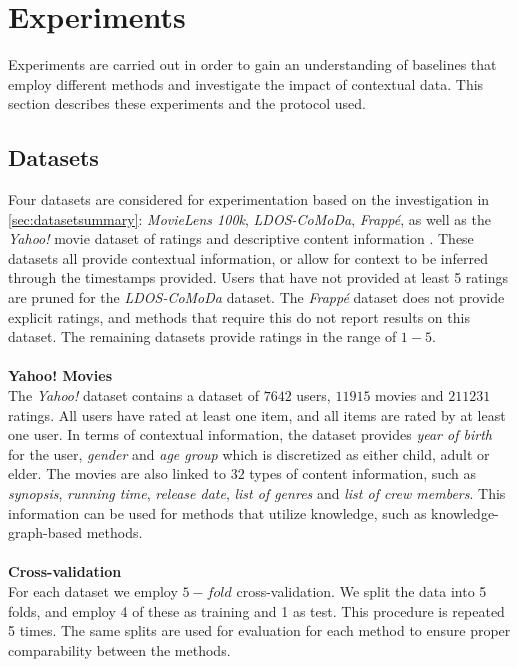 \section{Experiments}
Experiments are carried out in order to gain an understanding of baselines that employ different methods and investigate the impact of contextual data.
This section describes these experiments and the protocol used.

\subsection{Datasets}
Four datasets are considered for experimentation based on the investigation in \autoref{sec:datasetsummary}: \textit{MovieLens 100k}, \textit{LDOS-CoMoDa}, \textit{Frappé}, as well as the \textit{Yahoo!} movie dataset of ratings and descriptive content information \cite{yahoo-movie}.
These datasets all provide contextual information, or allow for context to be inferred through the timestamps provided.
Users that have not provided at least 5 ratings are pruned for the \textit{LDOS-CoMoDa} dataset.
The \textit{Frappé} dataset does not provide explicit ratings, and methods that require this do not report results on this dataset.
The remaining datasets provide ratings in the range of $1-5$.
\\\\
\textbf{Yahoo! Movies}\\
The \textit{Yahoo!} dataset contains a dataset of $7642$ users, $11915$ movies and $211231$ ratings.
All users have rated at least one item, and all items are rated by at least one user.
In terms of contextual information, the dataset provides \textit{year of birth} for the user, \textit{gender} and \textit{age group} which is discretized as either child, adult or elder.
The movies are also linked to $32$ types of content information, such as \textit{synopsis}, \textit{running time}, \textit{release date}, \textit{list of genres} and \textit{list of crew members}.
This information can be used for methods that utilize knowledge, such as knowledge-graph-based methods.
\\\\
\textbf{Cross-validation}\\
For each dataset we employ $5-fold$ cross-validation.
We split the data into 5 folds, and employ 4 of these as training and 1 as test.
This procedure is repeated 5 times.
The same splits are used for evaluation for each method to ensure proper comparability between the methods.

